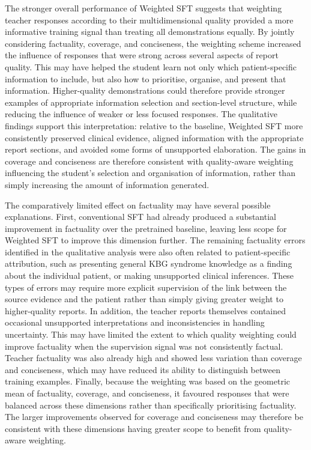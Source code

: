 \documentclass[ %
                    author={Aman Kumar Singh},
                supervisor={Dr. Edwin Simpson},
                    degree={MSc},
                     title={Quality-Aware Knowledge Distillation of Large Language Models for Efficient Personalised Clinical Report Generation},
                  subtitle={},
                      type={},
                      year={2021}]{dissertation}
\begin{document}
The stronger overall performance of Weighted SFT suggests that weighting
teacher responses according to their multidimensional quality provided a more
informative training signal than treating all demonstrations equally. By
jointly considering factuality, coverage, and conciseness, the weighting
scheme increased the influence of responses that were strong across several
aspects of report quality. This may have helped the student learn not only
which patient-specific information to include, but also how to prioritise,
organise, and present that information. Higher-quality demonstrations could
therefore provide stronger examples of appropriate information selection and
section-level structure, while reducing the influence of weaker or less
focused responses. The qualitative findings support this interpretation:
relative to the baseline, Weighted SFT more consistently preserved clinical
evidence, aligned information with the appropriate report sections, and
avoided some forms of unsupported elaboration. The gains in coverage and
conciseness are therefore consistent with quality-aware weighting influencing
the student's selection and organisation of information, rather than simply
increasing the amount of information generated.

The comparatively limited effect on factuality may have several possible
explanations. First, conventional SFT had already produced a substantial
improvement in factuality over the pretrained baseline, leaving less scope
for Weighted SFT to improve this dimension further. The remaining factuality
errors identified in the qualitative analysis were also often related to
patient-specific attribution, such as presenting general KBG syndrome
knowledge as a finding about the individual patient, or making unsupported
clinical inferences. These types of errors may require more explicit
supervision of the link between the source evidence and the patient rather
than simply giving greater weight to higher-quality reports. In addition,
the teacher reports themselves contained occasional unsupported
interpretations and inconsistencies in handling uncertainty. This may have
limited the extent to which quality weighting could improve factuality when
the supervision signal was not consistently factual. Teacher factuality was
also already high and showed less variation than coverage and conciseness,
which may have reduced its ability to distinguish between training examples.
Finally, because the weighting was based on the geometric mean of factuality,
coverage, and conciseness, it favoured responses that were balanced across
these dimensions rather than specifically prioritising factuality. The
larger improvements observed for coverage and conciseness may therefore be
consistent with these dimensions having greater scope to benefit from
quality-aware weighting.
\end{document}
